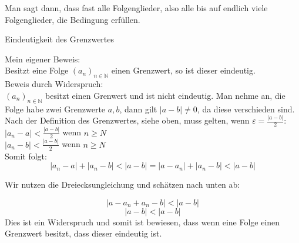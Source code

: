 \documentclass[smallheadings,headsepline,12pt,a4paper]{scrartcl}
\begin{document}
Man sagt dann, dass fast alle Folgenglieder, also alle bis auf endlich viele Folgenglieder, die Bedingung erfüllen. \\

\begin{center}
\item[Eindeutigkeit des Grenzwertes]
\end{center}
\item Mein eigener Beweis: \\
Besitzt eine Folge $ (a_n)_{n \in \mathbb{N}} $ einen Grenzwert, so ist dieser eindeutig.  \\

Beweis durch Widerspruch: \\

$ (a_n)_{n \in \mathbb{N}} $ besitzt einen Grenwert und ist nicht eindeutig.
Man nehme an, die Folge habe zwei Grenzwerte $a,b$, dann gilt $|a-b|\neq 0 $, da diese verschieden sind.\\

Nach der Definition des Grenzwertes, siehe oben, muss gelten, wenn $\varepsilon = \frac{|a-b|}{2} $: \\

$|a_n - a| < \frac{|a-b|}{2}$ wenn $ n \geq  N $ \\
$|a_n - b| < \frac{|a-b|}{2}$ wenn $ n \geq  N $ \\

Somit folgt: \\
$$|a_n - a| + |a_n - b| < |a-b|  = |a- a_n| + |a_n - b| < |a-b| $$

Wir nutzen die Dreiecksungleichung und schätzen nach unten ab: 

$$|a-a_n+a_n - b| < |a-b| $$
$$ |a-b| < |a-b| $$ Dies ist ein Widerspruch und somit ist bewiesen, dass wenn eine Folge einen Grenzwert besitzt, dass dieser eindeutig ist. \\





\newpage
\end{document}
